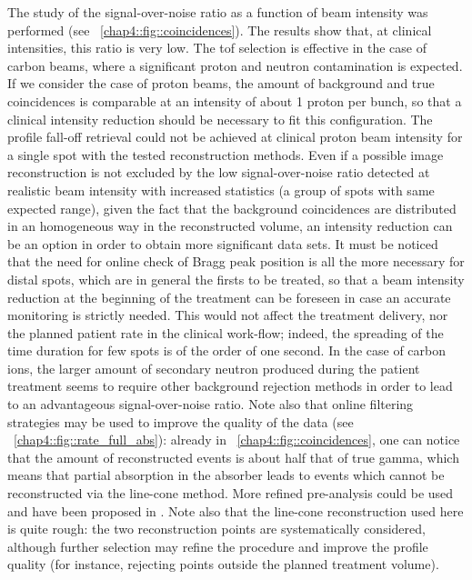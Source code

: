 The study of the signal-over-noise ratio as a function of beam intensity was performed (see \figurename~\ref{chap4::fig::coincidences}). The results show that, at clinical intensities, this ratio is very low. The \gls{tof} selection is effective in the case of carbon beams, where a significant proton and neutron contamination is expected. If we consider the case of proton beams, the amount of background and true coincidences is comparable at an intensity of about 1 proton per bunch, so that a clinical intensity reduction should be necessary to fit this configuration. The profile fall-off retrieval could not be achieved at clinical proton beam intensity for a single spot with the tested reconstruction methods. Even if a possible image reconstruction is not excluded by the low signal-over-noise ratio detected at realistic beam intensity with increased statistics (a group of spots with same expected range), given the fact that the background coincidences are distributed in an homogeneous way in the reconstructed volume, an intensity reduction can be an option in order to obtain more significant data sets. It must be noticed that the need for online check of Bragg peak position is all the more necessary for distal spots, which are in general the firsts to be treated, so that a beam intensity reduction at the beginning of the treatment can be foreseen in case an accurate monitoring is strictly needed. This would not affect the treatment delivery, nor the planned patient rate in the clinical work-flow; indeed, the spreading of the time duration for few spots is of the order of one second. 
In the case of carbon ions, the larger amount of secondary neutron produced during the patient treatment seems to require other background rejection methods in order to lead to an advantageous signal-over-noise ratio. Note also that online filtering strategies may be used to improve the quality of the data (see \figurename~\ref{chap4::fig::rate_full_abs}): already in \figurename~\ref{chap4::fig::coincidences}, one can notice that the amount of reconstructed events is about half that of true gamma, which means that partial absorption in the absorber leads to events which cannot be reconstructed via the line-cone method. More refined pre-analysis could be used and have been proposed in \cite{Draeger2017}. Note also that the line-cone reconstruction used here is quite rough: the two reconstruction points are systematically considered, although further selection may refine the procedure and improve the profile quality (for instance, rejecting points outside the planned treatment volume).
